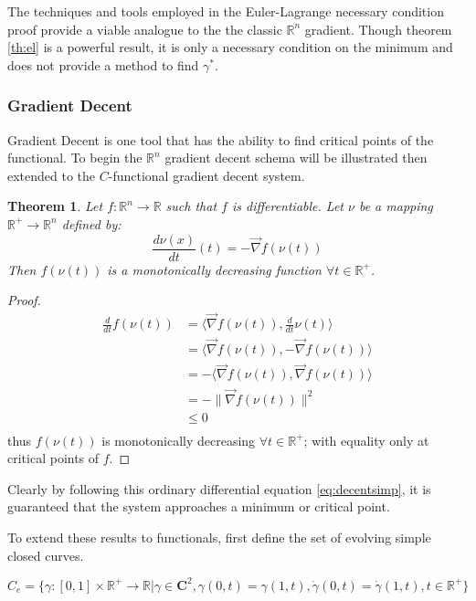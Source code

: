 \documentclass{article}
\newcommand{\R}{\mathds{R}}
\newtheorem{thm}{Theorem}
\begin{document}
					The techniques and tools employed in the Euler-Lagrange necessary condition proof provide a viable analogue to the the classic $\R^n$ gradient. Though theorem \ref{th:el} is a powerful result, it is only a necessary condition on the minimum and does not provide a method to find $\gamma^*$.

				\subsubsection{Gradient Decent}	
					Gradient Decent is one tool that has the ability to find critical points of the functional. To begin the $\R^n$ gradient decent schema will be illustrated then extended to the $C$-functional gradient decent system. 

					\begin{thm}\label{th:graddissimp}
						Let $f: \R^n\rightarrow\R$ such that $f$ is differentiable. Let $\nu$ be a mapping $\R^+ \rightarrow \R^n$ defined by:
						\begin{equation}\label{eq:decentsimp}
							\frac{d\nu(x)}{dt}(t) = -\vec\nabla f(\nu(t))
						\end{equation} 
						Then $f(\nu(t))$ is a monotonically decreasing function $\forall t\in\R^+$.
					\end{thm}
					\begin{proof}
						\begin{align*}
							\frac{d}{dt}f(\nu(t)) &= \langle \vec\nabla f(\nu(t)) , \frac{d}{dt}\nu(t)\rangle\\
							&= \langle \vec\nabla f(\nu(t)) , -\vec\nabla f(\nu(t))\rangle\\
							&= -\langle \vec\nabla f(\nu(t)) , \vec\nabla f(\nu(t))\rangle\\
							&= - \|\vec\nabla f(\nu(t))\|^2\\
							&\leq 0\\
						\end{align*}
						thus $f(\nu(t))$ is monotonically decreasing $\forall t\in\R^+$; with equality only at critical points of $f$.
					\end{proof}	

					Clearly by following this ordinary differential equation \ref{eq:decentsimp}, it is guaranteed that the system approaches a minimum or critical point.

					To extend these results to functionals, first define the set of evolving simple closed curves.

					\begin{equation}\label{eq:simpevolvecurv}
						C_e = \{\gamma: [0,1]\times\R^+\rightarrow\R | \gamma \in \textbf{C}^2, \gamma(0,t)=\gamma(1,t), \dot\gamma(0,t)=\dot\gamma(1,t),t\in\R^+\}
					\end{equation}
\end{document}
